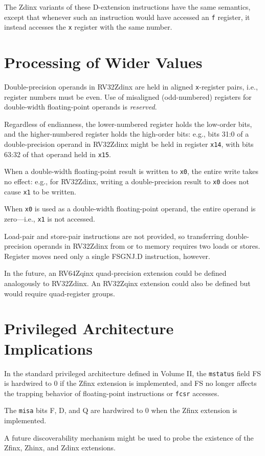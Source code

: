 The Zdinx variants of these D-extension instructions have the same semantics,
except that whenever such an instruction would have accessed an {\tt f}
register, it instead accesses the {\tt x} register with the same number.

\section{Processing of Wider Values}

Double-precision operands in RV32Zdinx
are held in aligned {\tt x}-register pairs, i.e.,
register numbers must be even.
Use of misaligned (odd-numbered) registers for double-width floating-point
operands is {\em reserved}.

Regardless of endianness, the lower-numbered register holds the low-order
bits, and the higher-numbered register holds the high-order bits: e.g., bits
31:0 of a double-precision operand in RV32Zdinx might be held in register
{\tt x14}, with bits 63:32 of that operand held in {\tt x15}.

When a double-width floating-point result is written to {\tt x0}, the entire
write takes no effect: e.g., for RV32Zdinx, writing a double-precision result
to {\tt x0} does not cause {\tt x1} to be written.

When {\tt x0} is used as a double-width floating-point operand, the entire
operand is zero---i.e., {\tt x1} is not accessed.

\begin{commentary}
Load-pair and store-pair instructions are not provided, so transferring
double-precision operands in RV32Zdinx from or to memory requires
two loads or stores.
Register moves need only a single FSGNJ.D instruction, however.
\end{commentary}

\begin{commentary}
In the future, an RV64Zqinx quad-precision extension could be defined analogously
to RV32Zdinx.
An RV32Zqinx extension could also be defined but would require
quad-register groups.
\end{commentary}

\section{Privileged Architecture Implications}

In the standard privileged architecture defined in Volume II, the
{\tt mstatus} field FS is hardwired to 0 if the Zfinx extension is
implemented, and FS no longer affects the trapping behavior of
floating-point instructions or {\tt fcsr} accesses.

The {\tt misa} bits F, D, and Q are hardwired to 0 when the Zfinx
extension is implemented.

\begin{commentary}
A future discoverability mechanism might be used to probe the existence
of the Zfinx, Zhinx, and Zdinx extensions.
\end{commentary}
